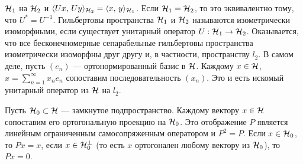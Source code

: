 \documentclass[a4paper
]{article}
\begin{document}
${\cal H}_1$ на ${\cal H}_2$ и $\langle Ux, \, Uy\rangle_{{\cal
H}_2}=\langle x, \, y\rangle_{{\cal H}_1}$. Если ${\cal H}_1=
{\cal H}_2$, то это эквивалентно тому, что $U^*=U^{-1}$.
Гильбертовы пространства ${\cal H}_1$ и ${\cal H}_2$ называются
изометрически изоморфными, если существует унитарный оператор
$U:{\cal H}_1\rightarrow {\cal H}_2$. Оказывается, что все
бесконечномерные сепарабельные гильбертовы пространства изометрически
изоморфны друг другу и, в частности, пространству $l_2$.
В самом деле, пусть $(e_n)$ --- ортонормированный базис в ${\cal H}$.
Каждому $x\in {\cal H}$, $x=\sum \limits_{n=1}^\infty x_ne_n$
сопоставим последовательность $(x_n)$. Это и есть искомый унитарный
оператор из ${\cal H}$ на $l_2$. \par
Пусть ${\cal H}_0\subset {\cal H}$ --- замкнутое подпространство.
Каждому вектору $x\in {\cal H}$ сопоставим его ортогональную
проекцию на ${\cal H}_0$. Это отображение $P$ является линейным
ограниченным самосопряженным оператором и $P^2=P$. Если $x\in
{\cal H}_0$, то $Px=x$, если $x\in {\cal H}_0^{\bot}$ (то есть $x$
ортогонален любому вектору из ${\cal H}_0$), то $Px=0$.
\end{document}
